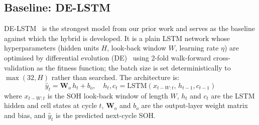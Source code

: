 \begin{table}[pos=tbp]
\centering
\caption{Datasets used in this study.}\label{tab:datasets}
\footnotesize
{}
\end{table}

\subsection{Baseline: DE-LSTM}\label{sec:delstm}

DE-LSTM~\cite{ponnambalam2026delstm} is the strongest model from our prior work
and serves as the baseline against which the hybrid is developed.
It is a plain LSTM network whose
hyperparameters (hidden units $H$, look-back window $W$,
learning rate $\eta$) are optimised by differential
evolution (DE)~\cite{storn1997differential} using
2-fold walk-forward cross-validation as the fitness function;
the batch size is set deterministically to $\max(32, H)$ rather than searched.
The architecture is:
\begin{equation}
  \hat{y}_t = \mathbf{W}_o\, h_t + b_o,\quad
  h_t, c_t = \mathrm{LSTM}(x_{t-W:t},\, h_{t-1}, c_{t-1})
\end{equation}
where $x_{t-W:t}$ is the SOH look-back window of length $W$, $h_t$ and $c_t$ are
the LSTM hidden and cell states at cycle $t$, $\mathbf{W}_o$ and $b_o$ are the
output-layer weight matrix and bias, and $\hat{y}_t$ is the predicted next-cycle
SOH.


